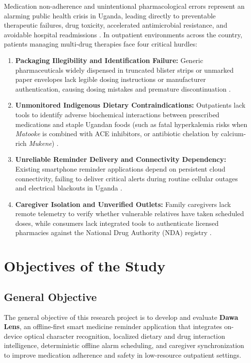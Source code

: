 Medication non-adherence and unintentional pharmacological errors represent an alarming public health crisis in Uganda, leading directly to preventable therapeutic failures, drug toxicity, accelerated antimicrobial resistance, and avoidable hospital readmissions \cite{who2017medication, muddu2021hypertension}. In outpatient environments across the country, patients managing multi-drug therapies face four critical hurdles:
\begin{enumerate}[noitemsep,topsep=2pt]
  \item \textbf{Packaging Illegibility and Identification Failure:} Generic pharmaceuticals widely dispensed in truncated blister strips or unmarked paper envelopes lack legible dosing instructions or manufacturer authentication, causing dosing mistakes and premature discontinuation \cite{parker2016health}.
  \item \textbf{Unmonitored Indigenous Dietary Contraindications:} Outpatients lack tools to identify adverse biochemical interactions between prescribed medications and staple Ugandan foods (such as fatal hyperkalemia risks when \textit{Matooke} is combined with ACE inhibitors, or antibiotic chelation by calcium-rich \textit{Mukene}) \cite{bushra2011food}.
  \item \textbf{Unreliable Reminder Delivery and Connectivity Dependency:} Existing smartphone reminder applications depend on persistent cloud connectivity, failing to deliver critical alerts during routine cellular outages and electrical blackouts in Uganda \cite{kintu2021development}.
  \item \textbf{Caregiver Isolation and Unverified Outlets:} Family caregivers lack remote telemetry to verify whether vulnerable relatives have taken scheduled doses, while consumers lack integrated tools to authenticate licensed pharmacies against the National Drug Authority (NDA) registry \cite{nda2024register}.
\end{enumerate}

\section{Objectives of the Study}

\subsection{General Objective}

The general objective of this research project is to develop and evaluate \textbf{Dawa Lens}, an offline-first smart medicine reminder application that integrates on-device optical character recognition, localized dietary and drug interaction intelligence, deterministic offline alarm scheduling, and caregiver synchronization to improve medication adherence and safety in low-resource outpatient settings.

